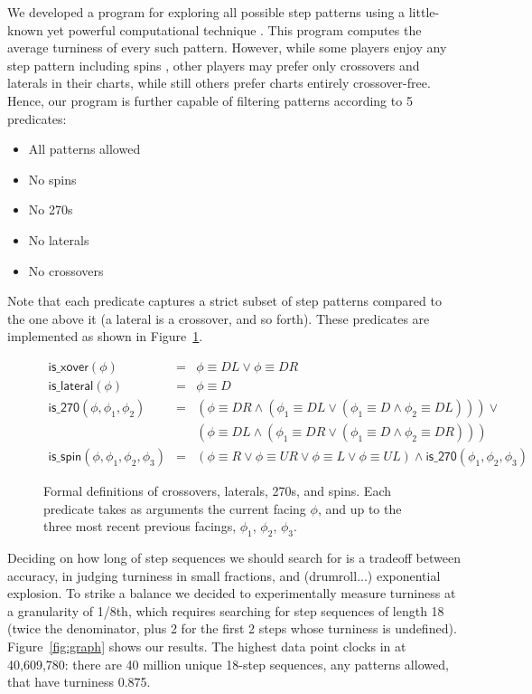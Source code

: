 \documentclass[10pt]{sigplanconf}
\begin{document}
We developed a program for exploring all possible step patterns using a little-known yet powerful computational technique \cite{bruteforce1,bruteforce2}.
This program computes the average turniness of every such pattern.
However, while some players enjoy any step pattern including spins \cite{alanv},
other players may prefer only crossovers and laterals in their charts,
while still others prefer charts entirely crossover-free.
Hence, our program is further capable of filtering patterns according to 5 predicates:
\begin{itemize}
	\item All patterns allowed
	\item No spins
	\item No 270s
	\item No laterals
	\item No crossovers
\end{itemize}
Note that each predicate captures a strict subset of step patterns compared to the one above it (a lateral is a crossover, and so forth).
These predicates are implemented as shown in Figure~\ref{fig:eqn}.

\begin{figure}
	\begin{eqnarray*}
		\mathsf{is\_xover}(\phi) &=& \phi \equiv DL \vee \phi \equiv DR \\
		\mathsf{is\_lateral}(\phi) &=& \phi \equiv D \\
		\mathsf{is\_270}(\phi, \phi_1, \phi_2) &=& (\phi \equiv DR \wedge (\phi_1 \equiv DL \vee (\phi_1 \equiv D \wedge \phi_2 \equiv DL))) \vee \\
                                              & & (\phi \equiv DL \wedge (\phi_1 \equiv DR \vee (\phi_1 \equiv D \wedge \phi_2 \equiv DR))) \\
		\mathsf{is\_spin}(\phi, \phi_1, \phi_2, \phi_3) &=& (\phi \equiv R \vee \phi \equiv UR \vee \phi \equiv L \vee \phi \equiv UL) \wedge \mathsf{is\_270}(\phi_1, \phi_2, \phi_3)
	\end{eqnarray*}
	\caption{Formal definitions of crossovers, laterals, 270s, and spins. Each predicate takes as arguments the current facing $\phi$, and up to the three most recent previous facings, $\phi_1$, $\phi_2$, $\phi_3$.}
	\label{fig:eqn}
\end{figure}

Deciding on how long of step sequences we should search for is a tradeoff between accuracy, in judging turniness in small fractions, and (drumroll...) exponential explosion.
To strike a balance we decided to experimentally measure turniness at a granularity of 1/8th, which requires searching for step sequences of length 18 (twice the denominator, plus 2 for the first 2 steps whose turniness is undefined).
Figure~\ref{fig:graph} shows our results.
The highest data point clocks in at 40,609,780: there are 40 million unique 18-step sequences, any patterns allowed, that have turniness 0.875.
\end{document}
